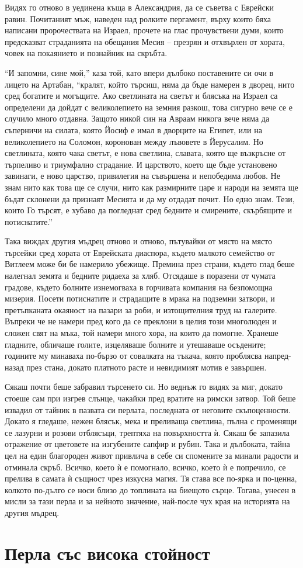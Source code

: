 \documentclass[oneside,10pt]{memoir}
\begin{document}
Видях го отново в уединена къща в Александрия, да се съветва с Еврейски равин.
Почитаният мъж, наведен над ролките пергамент, върху които бяха написани
пророчествата на Израел, прочете на глас прочувствени думи, които предсказват
страданията на обещания Месия -- презрян и отхвърлен от хората, човек на
покаянието и познайник на скръбта.

``И запомни, сине мой,'' каза той, като впери дълбоко поставените си очи в
лицето на Артабан, ``кралят, който търсиш, няма да бъде намерен в дворец, нито
сред богатите и могъщите. Ако светлината на светът и блясъка на Израел са
определени да дойдат с великолепието на земния разкош, това сигурно вече се е
случило много отдавна. Защото никой син на Авраам никога вече няма да съперничи
на силата, която Йосиф е имал в дворците на Египет, или на великолепието на
Соломон, коронован между лъвовете в Йерусалим. Но светлината, която чака светът,
е нова светлина, славата, която ще възкръсне от търпеливо и триумфално
страдание. И царството, което ще бъде установено завинаги, е ново царство,
привилегия на съвършена и непобедима любов. Не знам нито как това ще се случи,
нито как размирните царе и народи на земята ще бъдат склонени да признаят
Месията и да му отдадат почит. Но едно знам. Тези, които Го търсят, е хубаво да
погледнат сред бедните и смирените, скърбящите и потиснатите.''

Така виждах другия мъдрец отново и отново, пътувайки от място на място търсейки
сред хората от Еврейската диаспора, където малкото семейство от Витлеем може би
бе намерило убежище. Премина през страни, където глад беше налегнал земята и
бедните ридаеха за хляб. Отсядаше в поразени от чумата градове, където болните
изнемогваха в горчивата компания на безпомощна мизерия. Посети потиснатите и
страдащите в мрака на подземни затвори, и претъпканата окаяност на пазари за
роби, и изтощителния труд на галерите. Въпреки че не намери пред кого да се
преклони в целия този многолюден и сложен свят на мъка, той намери много хора,
на които да помогне. Хранеше гладните, обличаше голите, изцеляваше болните и
утешаваше осъдените; годините му минаваха по-бързо от совалката на тъкача, която
проблясва напред-назад през стана, докато платното расте и невидимият мотив е
завършен.

Сякаш почти беше забравил търсенето си. Но веднъж го видях за миг, докато стоеше
сам при изгрев слънце, чакайки пред вратите на римски затвор. Той беше извадил
от тайник в пазвата си перлата, последната от неговите скъпоценности. Докато я
гледаше, нежен блясък, мека и преливаща светлина, пълна с променящи се лазурни и
розови отблясъци, трептяха на повърхността ѝ. Сякаш бе запазила отражение от
цветовете на изгубените сапфир и рубин. Така и дълбоката, тайна цел на един
благороден живот привлича в себе си спомените за минали радости и отминала
скръб. Всичко, което ѝ е помогнало, всичко, което ѝ е попречило, се прелива в
самата ѝ същност чрез изкусна магия. Тя става все по-ярка и по-ценна, колкото
по-дълго се носи близо до топлината на биещото сърце. Тогава, унесен в мисли за
тази перла и за нейното значение, най-после чух края на историята на другия
мъдрец.

\part{Перла със висока стойност}
\end{document}
